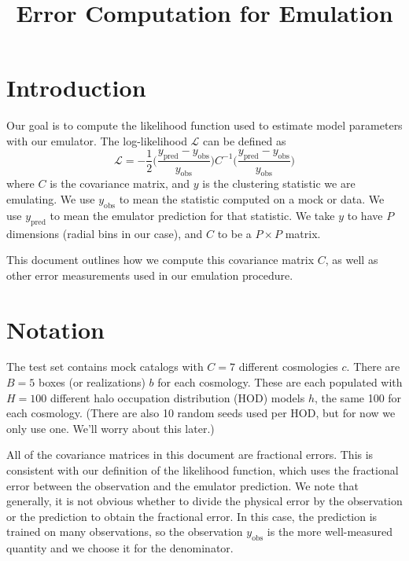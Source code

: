 \documentclass[12pt]{article}
\title{Error Computation for Emulation}
\newcommand{\inv}{^{-1}}
\newcommand{\cov}[1]{C^\text{#1}}
\newcommand{\covtot}{C}
\newcommand{\y}[1]{y_{\text{#1}}}
\begin{document}
\maketitle


\section{Introduction}

Our goal is to compute the likelihood function used to estimate model parameters with our emulator.
The log-likelihood $\mathcal{L}$ can be defined as 
\begin{equation}
    \mathcal{L} = -\frac{1}{2} \bigg( \frac{\y{pred} - \y{obs}}{\y{obs}} \bigg) \covtot\inv \bigg( \frac{\y{pred} - \y{obs}}{\y{obs}} \bigg)
\end{equation}
where $\covtot$ is the covariance matrix, and $y$ is the clustering statistic we are emulating.
We use $\y{obs}$ to mean the statistic computed on a mock or data. 
We use $\y{pred}$ to mean the emulator prediction for that statistic. 
We take $y$ to have $P$ dimensions (radial bins in our case), and $C$ to be a $P \times P$ matrix.

This document outlines how we compute this covariance matrix $\covtot$, as well as other error measurements used in our emulation procedure.

\section{Notation}
 
The test set contains mock catalogs with $C=7$ different cosmologies $c$. 
There are $B=5$ boxes (or realizations) $b$ for each cosmology. 
These are each populated with $H=100$ different halo occupation distribution (HOD) models $h$, the same 100 for each cosmology. 
(There are also 10 random seeds used per HOD, but for now we only use one. We'll worry about this later.)

All of the covariance matrices in this document are fractional errors.
This is consistent with our definition of the likelihood function, which uses the fractional error between the observation and the emulator prediction.
We note that generally, it is not obvious whether to divide the physical error by the observation or the prediction to obtain the fractional error.
In this case, the prediction is trained on many observations, so the observation $\y{obs}$ is the more well-measured quantity and we choose it for the denominator.
\end{document}
